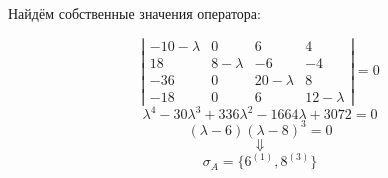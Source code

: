 \documentclass{article}
\begin{document}
\begin{center}
Найдём собственные значения оператора:
\end{center}
$$\left|\begin{matrix}
-10-\lambda & 0 & 6 & 4 \\
18 & 8-\lambda & -6 & -4 \\
-36 & 0 & 20-\lambda & 8 \\
-18 & 0 & 6 & 12-\lambda
\end{matrix}\right| = 0$$
$$\lambda^4-30\lambda^3+336\lambda^2-1664\lambda+3072 = 0$$
$$(\lambda-6)(\lambda-8)^{3}=0$$
$$\Downarrow$$
$$\sigma_A = \{6^{(1)},8^{(3)}\}$$
\end{document}
